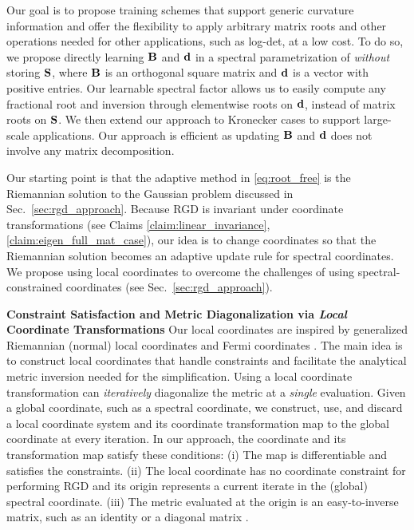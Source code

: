 

\vspace{-0.2cm}
Our goal is to propose training schemes that support
generic curvature information and
offer the flexibility to apply arbitrary matrix roots and other operations needed for other applications, such as log-det, at a low cost.
To do so, we propose directly learning $\mbox{$\mbox{$\mathbf{B}$}$}$ and $\mbox{$\mbox{$\mathbf{d}$}$}$ in a spectral parametrization of  \emph{without} storing $\mbox{$\mbox{$\mathbf{S}$}$}$, where $\mbox{$\mbox{$\mathbf{B}$}$}$ is an orthogonal square matrix and $\mbox{$\mbox{$\mathbf{d}$}$}$ is a vector with positive entries.
%
Our learnable spectral factor allows us to easily compute any fractional root and inversion  through elementwise roots on $\mbox{$\mbox{$\mathbf{d}$}$}$, instead of matrix roots on $\mbox{$\mbox{$\mathbf{S}$}$}$.
We then extend our approach to Kronecker cases to support large-scale applications. Our approach is efficient as updating $\mbox{$\mbox{$\mathbf{B}$}$}$ and $\mbox{$\mbox{$\mathbf{d}$}$}$ does not involve any matrix decomposition.

Our starting point is that the adaptive method in \eqref{eq:root_free} is the Riemannian solution to the Gaussian problem discussed in Sec.~\ref{sec:rgd_approach}.
Because RGD is invariant under coordinate transformations (see  Claims \ref{claim:linear_invariance}, \ref{claim:eigen_full_mat_case}), our idea is to change coordinates so that the Riemannian solution becomes an adaptive update rule for spectral coordinates.
We propose using local coordinates to overcome the challenges of using spectral-constrained coordinates (see  Sec.~\ref{sec:rgd_approach}).

{\bf Constraint Satisfaction and Metric Diagonalization  via \emph{Local} Coordinate Transformations}
Our local coordinates are inspired by generalized  Riemannian (normal) local coordinates \citep{glasmachers2010exponential,lin2023simplifying} and  Fermi coordinates \citep{manasse1963fermi}.
The main idea is to construct local coordinates that handle constraints and facilitate the analytical metric inversion needed for the simplification. 
Using a local coordinate transformation can \emph{iteratively} diagonalize the metric at a \emph{single} evaluation. 
Given a global coordinate, such as a spectral coordinate, we construct, use, and discard a local coordinate system and its coordinate transformation map to the global coordinate at every iteration.
In our approach, the coordinate and its transformation map satisfy these conditions: (i) The map is differentiable 
and satisfies the constraints.
(ii) The local coordinate has no coordinate constraint for
performing RGD  and its origin represents a current iterate in the (global) spectral coordinate.
(iii) The metric evaluated at the origin is an easy-to-inverse matrix, such as an identity \citep{lin2023simplifying} or a diagonal matrix \citep{glasmachers2010exponential}.

